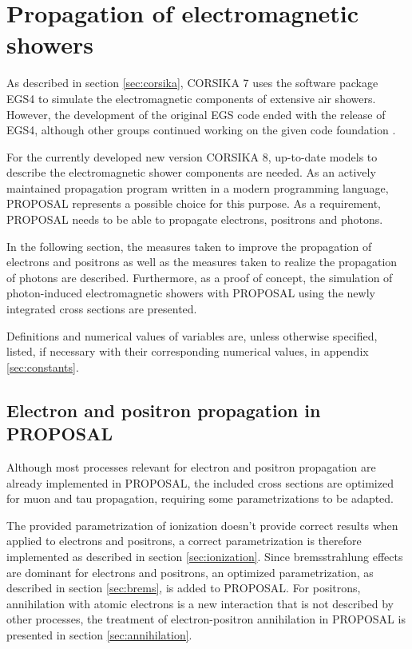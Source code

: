 \chapter{Propagation of electromagnetic showers}

As described in section \ref{sec:corsika}, CORSIKA 7 uses the software package EGS4 to simulate the electromagnetic components of extensive air showers.
However, the development of the original EGS code ended with the release of EGS4, although other groups continued working on the given code foundation \cite{Hirayama:2005zm} \cite{Kawrakow2016TheEC}.

For the currently developed new version CORSIKA 8, up-to-date models to describe the electromagnetic shower components are needed.
As an actively maintained propagation program written in a modern programming language, PROPOSAL represents a possible choice for this purpose.
As a requirement, PROPOSAL needs to be able to propagate electrons, positrons and photons.

In the following section, the measures taken to improve the propagation of electrons and positrons as well as the measures taken to realize the propagation of photons are described.
Furthermore, as a proof of concept, the simulation of photon-induced electromagnetic showers with PROPOSAL using the newly integrated cross sections are presented.

Definitions and numerical values of variables are, unless otherwise specified, listed, if necessary with their corresponding numerical values, in appendix \ref{sec:constants}.

\section{Electron and positron propagation in PROPOSAL}

Although most processes relevant for electron and positron propagation are already implemented in PROPOSAL, the included cross sections are optimized for muon and tau propagation, requiring some parametrizations to be adapted.

The provided parametrization of ionization doesn't provide correct results when applied to electrons and positrons, a correct parametrization is therefore implemented as described in section \ref{sec:ionization}.
Since bremsstrahlung effects are dominant for electrons and positrons, an optimized parametrization, as described in section \ref{sec:brems}, is added to PROPOSAL.
For positrons, annihilation with atomic electrons is a new interaction that is not described by other processes, the treatment of electron-positron annihilation in PROPOSAL is presented in section \ref{sec:annihilation}.

